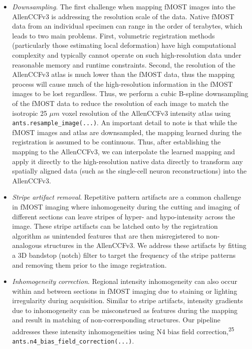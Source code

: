 \documentclass[
  12pt,
]{article}
\begin{document}
\begin{itemize}
\item
  \emph{Downsampling}. The first challenge when mapping fMOST images
  into the AllenCCFv3 is addressing the resolution scale of the data.
  Native fMOST data from an individual specimen can range in the order
  of terabytes, which leads to two main problems. First, volumetric
  registration methods (particularly those estimating local deformation)
  have high computational complexity and typically cannot operate on
  such high-resolution data under reasonable memory and runtime
  constraints. Second, the resolution of the AllenCCFv3 atlas is much
  lower than the fMOST data, thus the mapping process will cause much of
  the high-resolution information in the fMOST images to be lost
  regardless. Thus, we perform a cubic B-spline downsampling of the
  fMOST data to reduce the resolution of each image to match the
  isotropic 25 \(\mu m\) voxel resolution of the AllenCCFv3 intensity
  atlas using \texttt{ants.resample\_image(...)}. An important detail to
  note is that while the fMOST images and atlas are downsampled, the
  mapping learned during the registration is assumed to be continuous.
  Thus, after establishing the mapping to the AllenCCFv3, we can
  interpolate the learned mapping and apply it directly to the
  high-resolution native data directly to transform any spatially
  aligned data (such as the single-cell neuron reconstructions) into the
  AllenCCFv3.
\item
  \emph{Stripe artifact removal}. Repetitive pattern artifacts are a
  common challenge in fMOST imaging where inhomogeneity during the
  cutting and imaging of different sections can leave stripes of hyper-
  and hypo-intensity across the image. These stripe artifacts can be
  latched onto by the registration algorithm as unintended features that
  are then misregistered to non-analogous structures in the AllenCCFv3.
  We address these artifacts by fitting a 3D bandstop (notch) filter to
  target the frequency of the stripe patterns and removing them prior to
  the image registration.
\item
  \emph{Inhomogeneity correction}. Regional intensity inhomogeneity can
  also occur within and between sections in fMOST imaging due to
  staining or lighting irregularity during acquisition. Similar to
  stripe artifacts, intensity gradients due to inhomogeneity can be
  misconstrued as features during the mapping and result in matching of
  non-corresponding structures. Our pipeline addresses these intensity
  inhomogeneities using N4 bias field correction,\textsuperscript{25}
  \texttt{ants.n4\_bias\_field\_correction(...)}.
\end{itemize}
\end{document}
